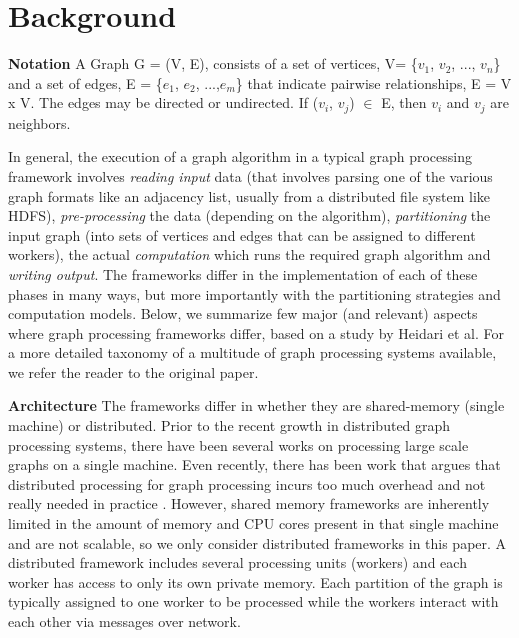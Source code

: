 \section{Background}
\label{sec:background}

\textbf{Notation} A Graph G = (V, E), consists of a set of vertices, 
V= \{$v_1$, $v_2$, ..., $v_n$\} and a set of edges, E = \{$e_1$, $e_2$, ...,$e_m$\} that 
indicate pairwise relationships, E = V x V. The edges may be directed or undirected. 
If ($v_i$, $v_j$) $\in$ E, then $v_i$ and $v_j$ are neighbors.

In general, the execution of a graph algorithm in a typical graph processing framework
involves \textit{reading input} data (that involves parsing one of the various graph formats 
like an adjacency list, usually from a distributed file system like HDFS), 
\textit{pre-processing} the data (depending on the algorithm), \textit{partitioning} 
the input graph (into sets of vertices and edges that can be assigned to different workers),
the actual \textit{computation} which runs the required graph algorithm and 
\textit{writing output}. The frameworks differ in the implementation of each of these phases
in many ways, but more importantly with the partitioning strategies and computation models. 
Below, we summarize few major (and relevant) aspects where graph processing frameworks differ, 
based on a study by Heidari et al\cite{Heidari:2018:SGP:3212709.3199523}. 
For a more detailed taxonomy of a multitude of 
graph processing systems available, we refer the reader to the original paper.

\textbf{Architecture}
The frameworks differ in whether they are shared-memory (single machine) or distributed. 
Prior to the recent growth in distributed graph processing systems, there have been 
several works on processing large scale graphs on a single machine. Even recently, there has been
work that argues that distributed processing for graph processing incurs too much overhead and 
not really needed in practice \cite{McSherry:2015:SBC:2831090.2831104}. However, shared memory 
frameworks are inherently limited in the amount of memory and CPU cores present in that single 
machine and are not scalable, so we only consider distributed frameworks in this paper.
A distributed framework includes several processing units (workers) and
each worker has access to only its own private memory. Each partition of the graph is typically 
assigned to one worker to be processed while the workers interact with each other via messages over
network. 

